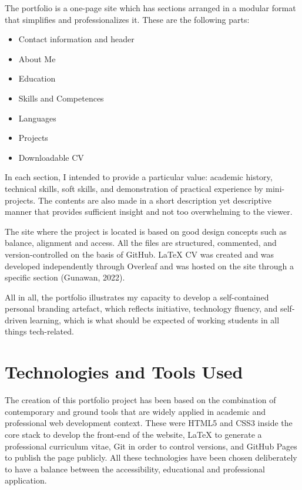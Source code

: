 \documentclass[11pt,a4paper]{article}
\begin{document}
The portfolio is a one-page site which has sections arranged in a modular format that simplifies and professionalizes it. These are the following parts:

\begin{itemize}
    \item Contact information and header
    \item About Me
    \item Education
    \item Skills and Competences
    \item Languages
    \item Projects
    \item Downloadable CV
\end{itemize}

In each section, I intended to provide a particular value: academic history, technical skills, soft skills, and demonstration of practical experience by mini-projects. The contents are also made in a short description yet descriptive manner that provides sufficient insight and not too overwhelming to the viewer.

The site where the project is located is based on good design concepts such as balance, alignment and access. All the files are structured, commented, and version-controlled on the basis of GitHub. LaTeX CV was created and was developed independently through Overleaf and was hosted on the site through a specific section (Gunawan, 2022).

All in all, the portfolio illustrates my capacity to develop a self-contained personal branding artefact, which reflects initiative, technology fluency, and self-driven learning, which is what should be expected of working students in all things tech-related.
\section*{Technologies and Tools Used}

The creation of this portfolio project has been based on the combination of contemporary and ground tools that are widely applied in academic and professional web development context. These were HTML5 and CSS3 inside the core stack to develop the front-end of the website, LaTeX to generate a professional curriculum vitae, Git in order to control versions, and GitHub Pages to publish the page publicly. All these technologies have been chosen deliberately to have a balance between the accessibility, educational and professional application.
\end{document}
